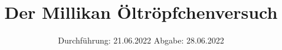 

\subject{V503}
\title{Der Millikan Öltröpfchenversuch}
\date{%
  Durchführung: 21.06.2022
  \hspace{3em}
  Abgabe: 28.06.2022
}



\maketitle
\thispagestyle{empty}
\tableofcontents
\newpage







\printbibliography{}




